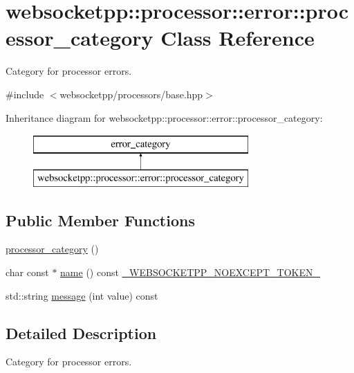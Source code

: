 \hypertarget{classwebsocketpp_1_1processor_1_1error_1_1processor__category}{}\section{websocketpp\+:\+:processor\+:\+:error\+:\+:processor\+\_\+category Class Reference}
\label{classwebsocketpp_1_1processor_1_1error_1_1processor__category}


Category for processor errors.  




{\ttfamily \#include $<$websocketpp/processors/base.\+hpp$>$}

Inheritance diagram for websocketpp\+:\+:processor\+:\+:error\+:\+:processor\+\_\+category\+:\begin{figure}[H]
\begin{center}
\leavevmode
\includegraphics[height=2.000000cm]{classwebsocketpp_1_1processor_1_1error_1_1processor__category}
\end{center}
\end{figure}
\subsection*{Public Member Functions}
\begin{DoxyCompactItemize}
\item 
\hyperlink{classwebsocketpp_1_1processor_1_1error_1_1processor__category_a6be64fa8b803699305182fc74b90f953}{processor\+\_\+category} ()
\item 
char const $\ast$ \hyperlink{classwebsocketpp_1_1processor_1_1error_1_1processor__category_a587e3e9c5c86807a6ca0d15505e34486}{name} () const \hyperlink{boost__config_8hpp_aa19747404a5f2fe9c9eb9e9d2e48f26c}{\+\_\+\+W\+E\+B\+S\+O\+C\+K\+E\+T\+P\+P\+\_\+\+N\+O\+E\+X\+C\+E\+P\+T\+\_\+\+T\+O\+K\+E\+N\+\_\+}
\item 
std\+::string \hyperlink{classwebsocketpp_1_1processor_1_1error_1_1processor__category_af74bad2654388c5229f95d6362d24f0f}{message} (int value) const 
\end{DoxyCompactItemize}


\subsection{Detailed Description}
Category for processor errors. 

